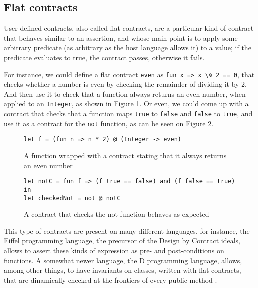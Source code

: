 \documentclass[sigplan,10pt,review,anonymous]{acmart}
\newcommand{\unsure}[2][1=]{}
\newcommand{\nickel}[1]{\lstinline[language=nickel]{#1}}
\begin{document}
\subsection*{Flat contracts}
\label{sec:flat-contracts}

\unsure{Should we define contracts prior to this?}
User defined contracts, also called flat contracts, are a particular
kind of contract that behaves similar to an assertion, and whose
main point is to apply some arbitrary predicate (as arbitrary as the
host language allows it) to a value; if the predicate evaluates to
true, the contract passes, otherwise it fails.

For instance, we could define a flat contract \nickel{even} as
\nickel{fun x => x \% 2 == 0}, that checks
whether a number is even by checking the remainder of dividing it by 2.
And then use it to check that a function always returns an
even number, when applied to an \nickel{Integer}, as shown in
Figure \ref{fig:num-to-even}.
Or even, we could come up with a contract that checks that a function
maps \nickel{true} to \nickel{false} and \nickel{false} to \nickel{true},
and use it as a contract for the \nickel{not} function, as can be seen on Figure
\ref{fig:checked-not}.

\begin{figure}[h]
\begin{center}
\begin{lstlisting}[language=nickel]
let f = (fun n => n * 2) @ (Integer -> even)
\end{lstlisting}
  \end{center}
\caption{A function wrapped with a contract stating that it always returns
an even number}
\label{fig:num-to-even}
\end{figure}


\begin{figure}[h]
  \begin{center}
\begin{lstlisting}[language=nickel]
let notC = fun f => (f true == false) and (f false == true) in
let checkedNot = not @ notC
\end{lstlisting}
\end{center}
\caption{A contract that checks the not function behaves as expected}
\label{fig:checked-not}
\end{figure}

This type of contracts are present on many different languages,
for instance, the Eiffel programming language\unsure{Citation?}, the precursor
of the Design by Contract ideals, allows to assert
these kinds of expression as pre- and post-conditions on
functions\cite{EiffelDesignByContract}.
A somewhat newer language, the D programming
language, allows, among other things, to have invariants on
classes\unsure{I (Arnaud) believe Eiffel has this feature as well,
  doesn't it?},
written with flat contracts, that are
dinamically checked at the frontiers of every public method \cite{DLangContracts}.
\end{document}
